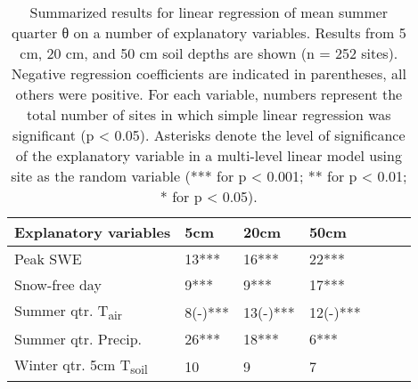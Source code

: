 
\begin{table}[p]

\centering

\caption{Summarized results for linear regression of mean summer quarter θ on a number of explanatory variables. Results from 5 cm, 20 cm, and 50 cm soil depths are shown (n = 252 sites). Negative regression coefficients are indicated in parentheses, all others were positive. For each variable, numbers represent the total number of sites in which simple linear regression was significant (p < 0.05). Asterisks denote the level of significance of the explanatory variable in a multi-level linear model using site as the random variable (*** for p < 0.001; ** for p < 0.01; * for p < 0.05).\label{regression_warm_t}}

\begin{tabular}{lllllll}
\toprule
Explanatory variables	&5cm	&20cm	&50cm\\
\midrule
Peak SWE	&13***	&16***	&22***\\
Snow-free day	&9***	&9***	&17***\\
Summer qtr. T\textsubscript{air}	&8(-)***	&13(-)***	&12(-)***\\
Summer qtr. Precip.	&26***	&18***	&6***\\
Winter qtr. 5cm T\textsubscript{soil} &10	&9	&7\\
\bottomrule
\end{tabular}

\end{table}
